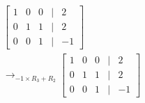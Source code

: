 \documentclass[preview]{standalone}
\begin{document}
\begin{align*}
\begin{bmatrix} 1 & 0 & 0 & | & 2 \\ 0 & 1 & 1 & | & 2 \\ 0 & 0 & 1 & | & -1 \end{bmatrix}\\ \rightarrow_{-1\times R_3 + R_2} \begin{bmatrix} 1 & 0 & 0 & | & 2 \\ 0 & 1 & 1 & | & 2 \\ 0 & 0 & 1 & | & -1 \end{bmatrix}
\end{align*}
\end{document}
